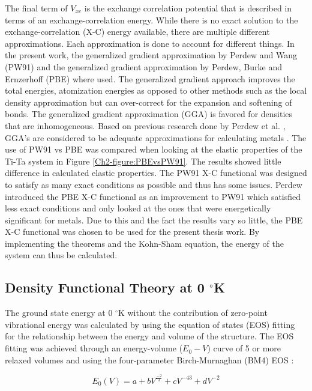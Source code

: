 \noindent The final term of $V_{xc}$ is the exchange correlation potential that is described in terms of an exchange-correlation energy. While there is no exact solution to the exchange-correlation (X-C) energy available, there are multiple different approximations. Each approximation is done to account for different things. In the present work, the generalized gradient approximation by Perdew and Wang (PW91) \cite{Perdew1992} and the generalized gradient approximation by Perdew, Burke and Ernzerhoff (PBE) \cite{Perdew1996a} where used. The generalized gradient approach improves the total energies, atomization energies as opposed to other methods such as the local density approximation \cite{Ceperley1980} but can over-correct for the expansion and softening of bonds. The generalized gradient approximation (GGA) is favored for densities that are inhomogeneous. Based on previous research done by Perdew et al. \cite{Perdew1996a}, GGA's are considered to be adequate approximations for calculating metals \cite{Perdew1996a}. The use of PW91 vs PBE was compared when looking at the elastic properties of the Ti-Ta system in Figure \ref{Ch2-figure:PBEvsPW91}. The results showed little difference in calculated elastic properties. The PW91 X-C functional was designed to satisfy as many exact conditions as possible and thus has some issues. Perdew introduced the PBE X-C functional as an improvement to PW91 which satisfied less exact conditions and only looked at the ones that were energetically significant for metals. Due to this and the fact the results vary so little, the PBE X-C functional was chosen to be used for the present thesis work. By implementing the theorems and the Kohn-Sham equation, the energy of the system can thus be calculated.

\subsection{Density Functional Theory at 0 $^\circ$K}

 The ground state energy at 0 $^\circ$K without the contribution of zero-point vibrational energy was calculated by using the equation of states (EOS) fitting for the relationship between the energy and volume of the structure. The EOS fitting was achieved through an energy-volume ($E_{0}-V$) curve of 5 or more relaxed volumes and using the four-parameter Birch-Murnaghan (BM4) EOS \cite{Shang2010}:

\begin{equation}
\label{eq: zeroenergy}
E_{0}(V) = a + bV^{\frac{-2}{3}} + cV^{{-4}{3}} + dV^{-2}
\end{equation}

